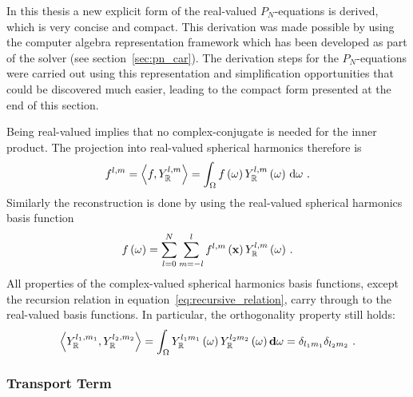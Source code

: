 In this thesis a new explicit form of the real-valued $P_N$-equations is derived, which is very concise and compact. This derivation was made possible by using the computer algebra representation framework which has been developed as part of the solver (see section~\ref{sec:pn_car}). The derivation steps for the $P_N$-equations were carried out using this representation and simplification opportunities that could be discovered much easier, leading to the compact form presented at the end of this section.

Being real-valued implies that no complex-conjugate is needed for the inner product. The projection into real-valued spherical harmonics therefore is
\begin{align}
\label{eq:sh_projection}
f^{l, m} = \left<f,Y_{\mathbb{R}}^{l, m}\right> = 
\int_\Omega f\left(\omega\right)Y_{\mathbb{R}}^{l,m}\left(\omega\right)\,\mathrm{d}\omega
\ .
\end{align}
Similarly the reconstruction is done by using the real-valued spherical harmonics basis function
\begin{align}
f\left(\omega\right) = 
\sum_{l=0}^{N}
{
\sum_{m=-l}^{l}
{
f^{l,m}\left(\mathbf{x}\right)Y_{\mathbb{R}}^{l,m}\left(\omega\right)
}
}
\ .
\label{eq:sh_real_reconstruction}
\end{align}
All properties of the complex-valued spherical harmonics basis functions, except the recursion relation in equation~\ref{eq:recursive_relation}, carry through to the real-valued basis functions. In particular, the orthogonality property still holds:
\begin{align}
\label{eq:sh_orthogonality_real}
\left<Y_{\mathbb{R}}^{l_1, m_1},Y_{\mathbb{R}}^{l_2, m_2}\right>=
\int_{\Omega} Y_{\mathbb{R}}^{l_1m_1}\left(\omega\right) Y_{\mathbb{R}}^{l_2m_2}\left(\omega\right) \mathbf{d}\omega = \delta_{l_1m_1}\delta_{l_2m_2}
\ .
\end{align}

\subsubsection*{Transport Term}

